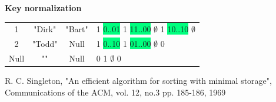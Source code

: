 \documentclass[usenames,dvipsnames, 18pt, compress, aspectratio=169]{beamer}
\begin{document}
\begin{frame}[fragile]{}
\begin{center}
\begin{overprint}[8cm]
    \end{overprint}
    \end{center}
\end{frame}

\begin{frame}[fragile]{}
    \frametitle{}

    \begin{center}
    \textbf{Key normalization}
    \vspace{1cm}

    \begin{tabular}{cccl}
        1 & "Dirk" & "Bart" &
            \colorbox{BurntOrange}{1}
            \colorbox{SpringGreen}{0..01}
            \colorbox{BurntOrange}{1}
            \colorbox{SpringGreen}{11..00}
            \colorbox{Gray!40}{$\emptyset$}
            \colorbox{BurntOrange}{1}
            \colorbox{SpringGreen}{10..10}
            \colorbox{Gray!40}{$\emptyset$} \\
        2 & "Todd" & Null &
            \colorbox{BurntOrange}{1}
            \colorbox{SpringGreen}{0..10}
            \colorbox{BurntOrange}{1}
            \colorbox{SpringGreen}{01..00}
            \colorbox{Gray!40}{$\emptyset$}
            \colorbox{BurntOrange}{0} \\
        Null & "" & Null &
            \colorbox{BurntOrange}{0}
            \colorbox{BurntOrange}{1}
            \colorbox{Gray!40}{$\emptyset$}
            \colorbox{BurntOrange}{0} \\
    \end{tabular}

    \linespread{0.5}
    \vspace{0.5cm}
    \color{black}\fontsize{6pt}{0}\selectfont
        R. C. Singleton, "An efficient algorithm for sorting with minimal
        storage", Communications of the ACM, vol. 12, no.3 pp. 185-186, 1969
    \linespread{1.5}

    \end{center}
\end{frame}
\end{document}

